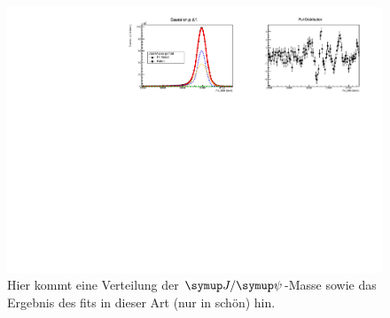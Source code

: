 %
\begin{figure}[H]
  \centering
      \includegraphics[width=1.2\textwidth]{Plots/BKGexp.pdf}
  \caption{Hier kommt eine Verteilung der $\jpsi$-Masse sowie das Ergebnis des fits in dieser Art (nur in schön) hin.}
  \label{fig:fit1}
\end{figure}
%

